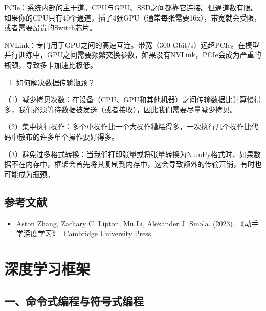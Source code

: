 PCIe：系统内部的主干道。CPU与GPU、SSD之间都靠它连接。但通道数有限。如果你的CPU只有40个通道，插了4张GPU（通常每张需要16x），带宽就会受限，或者需要昂贵的Switch芯片。

NVLink：专门用于GPU之间的高速互连。带宽（300 Gbit/s）远超PCIe。在模型并行训练中，GPU之间需要频繁交换参数，如果没有NVLink，PCIe会成为严重的瓶颈，导致多卡加速比极低。

\begin{enumerate}
\def\labelenumi{\arabic{enumi}.}
\setcounter{enumi}{1}
\tightlist
\item
  如何解决数据传输瓶颈？
\end{enumerate}

（1）减少拷贝次数：在设备（CPU、GPU和其他机器）之间传输数据比计算慢得多，我们必须等待数据被发送（或者接收），因此我们需要尽量减少拷贝。

（2）集中执行操作：多个小操作比一个大操作糟糕得多，一次执行几个操作比代码中散布的许多单个操作要好得多。

（3）避免过多格式转换：当我们打印张量或将张量转换为NumPy格式时，如果数据不在内存中，框架会首先将其复制到内存中，这会导致额外的传输开销，有时也可能成为瓶颈。

\hypertarget{ux53c2ux8003ux6587ux732e-32}{%
\subsection{参考文献}\label{ux53c2ux8003ux6587ux732e-32}}

\begin{itemize}
\tightlist
\item
  Aston Zhang, Zachary C. Lipton, Mu Li, Alexander J. Smola. (2023). \href{https://zh.d2l.ai/}{《动手学深度学习》}. Cambridge University Press.
\end{itemize}

\clearpage

\hypertarget{ux6df1ux5ea6ux5b66ux4e60ux6846ux67b6}{%
\section{深度学习框架}\label{ux6df1ux5ea6ux5b66ux4e60ux6846ux67b6}}

\hypertarget{ux4e00ux547dux4ee4ux5f0fux7f16ux7a0bux4e0eux7b26ux53f7ux5f0fux7f16ux7a0b}{%
\subsection{一、命令式编程与符号式编程}\label{ux4e00ux547dux4ee4ux5f0fux7f16ux7a0bux4e0eux7b26ux53f7ux5f0fux7f16ux7a0b}}

